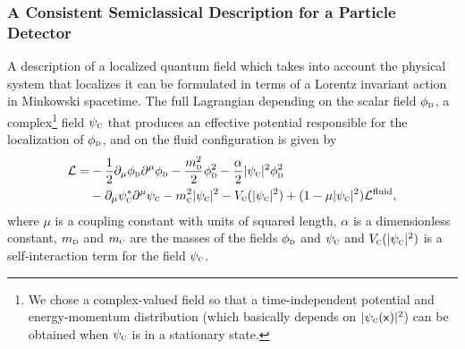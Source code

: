 \documentclass[letterpaper,12pt,titlepage,oneside,final]{book}
\newcommand{\mf}{\mathsf}%
\newcommand{\tc}[1]{\textsc{#1}}
\begin{document}
\subsubsection*{A Consistent Semiclassical Description for a Particle Detector}
\label{sec:model}

A description of a localized quantum field which takes into account the physical system that localizes it can be formulated in terms of a Lorentz invariant action in Minkowski spacetime. The full Lagrangian depending on the scalar field $\phi_\tc{d}$,  a complex\footnote{We chose a complex-valued field so that a time-independent potential and energy-momentum distribution (which basically depends on $|\psi_\tc{c}(\mf x)|^2$)  can be obtained when $\psi_\tc{c}$ is in a stationary state.} field $\psi_\tc{c}$ that produces an effective potential responsible for the localization of $\phi_{\tc{d}}$, and on the fluid configuration  is given by
\begin{equation}
\begin{aligned}
    \mathcal{L} = &- \frac{1}{2} \partial_\mu\phi_{\tc{d}}\partial^\mu\phi_{\tc{d}} - \frac{m_\tc{d}^2}{2} \phi_{\tc{d}}^2 - \frac{\alpha}{2} |\psi_{\tc{c}}|^2\phi_{\tc{d}}^2\\
    &- \partial_\mu\psi_\tc{c}^*\partial^\mu \psi_\tc{c} - m_\tc{c}^2|\psi_\tc{c}|^2 - V_{\tc{c}}(|\psi_\tc{c}|^2)+(1- \mu  |\psi_\tc{c}|^2) \mathcal{L}^{\textrm{fluid}},
    \label{full lagrangian}
\end{aligned}
\end{equation}
where $\mu$ is a coupling constant with units of squared length, $\alpha$ is a dimensionless constant, $m_\tc{d}$ and $m_\tc{c}$ are the masses of the fields $\phi_\tc{d}$ and $\psi_\tc{c}$ and $V_\tc{c}(|\psi_\tc{c}|^2)$ is a self-interaction term for the field $\psi_\tc{c}$.  
\end{document}
